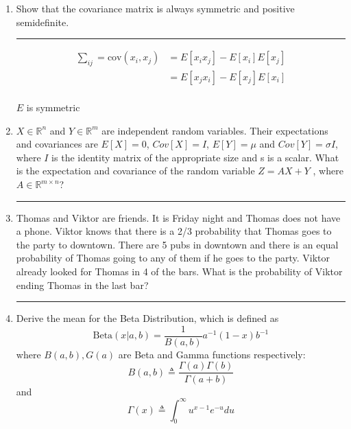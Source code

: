 \documentclass[12pt]{article}
\begin{document}
\begin{enumerate}
    \item Show that the covariance matrix is always symmetric and positive semidefinite.
     
    \noindent\rule{\linewidth}{1pt}
    \begin{align*}
        \sum_{ij} = \textrm{cov}(x_i,x_j) &= E[x_i x_j] - E[x_i] E[x_j] \\
                                          &= E[x_j x_i] - E[x_j] E[x_i] \\
    \end{align*}

    $E$ is symmetric

    
    \item $X \in \mathbb{R}^n$ and $Y \in \mathbb{R}^m$ are independent random variables. Their expectations and covariances are $E[X]=0$, $Cov[X] = I$, $E[Y] = \mu$ and $Cov[Y] = \sigma I$, 
        where $I$ is the identity matrix of the appropriate size and s is a scalar. What is the expectation and covariance of the random variable $Z = AX + Y$ , where $A \in \mathbb{R}^{m \times n}$? 
    
    \noindent\rule{\linewidth}{1pt}
    
    \item Thomas and Viktor are friends. It is Friday night and Thomas does not have a phone. Viktor knows that there is a 2/3 probability that Thomas goes to the party to downtown. 
          There are 5 pubs in downtown and there is an equal probability of Thomas going to any of them if he goes to the party. Viktor already looked for Thomas in 4 of the bars. 
          What is the probability of Viktor ending Thomas in the last bar? 
    
    \noindent\rule{\linewidth}{1pt}
    \item Derive the mean for the Beta Distribution, which is defined as 
    \begin{equation}
        \textrm{Beta}(x|a, b)= \frac{1}{B(a, b) } a^{-1}(1 - x)b^{-1} 
    \end{equation}
    where $B(a, b), G(a)$ are Beta and Gamma functions respectively: 
    \begin{equation}
        B(a, b) \triangleq \frac{\Gamma(a)\Gamma(b)}{\Gamma(a + b) }
    \end{equation}
    and 
    \begin{equation}
        \Gamma(x) \triangleq \int_0^{\infty } u^{x-1} e^{-u} d u
    \end{equation}


\end{enumerate}
\end{document}

